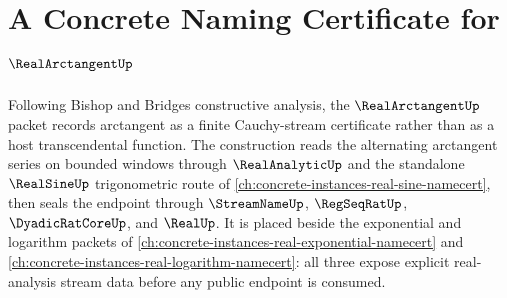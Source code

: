 \chapter{A Concrete Naming Certificate for $\RealArctangentUp$}
\label{ch:concrete-instances-real-arctangent-namecert}

Following Bishop and Bridges constructive analysis, the $\RealArctangentUp$ packet records arctangent as a finite Cauchy-stream certificate rather than as a host transcendental function. The construction reads the alternating arctangent series on bounded windows through $\RealAnalyticUp$ and the standalone $\RealSineUp$ trigonometric route of \autoref{ch:concrete-instances-real-sine-namecert}, then seals the endpoint through $\StreamNameUp$, $\RegSeqRatUp$, $\DyadicRatCoreUp$, and $\RealUp$. It is placed beside the exponential and logarithm packets of \autoref{ch:concrete-instances-real-exponential-namecert} and \autoref{ch:concrete-instances-real-logarithm-namecert}: all three expose explicit real-analysis stream data before any public endpoint is consumed.

